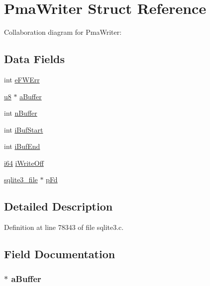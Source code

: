 \hypertarget{struct_pma_writer}{}\section{Pma\+Writer Struct Reference}
\label{struct_pma_writer}


Collaboration diagram for Pma\+Writer\+:
\subsection*{Data Fields}
\begin{DoxyCompactItemize}
\item 
int \hyperlink{struct_pma_writer_a328c9f566a5d1c3b17c5c7a19cb5db26}{e\+F\+W\+Err}
\item 
\hyperlink{sqlite3_8c_a74a0f6424ae628af25f23f0a35f6ead3}{u8} $\ast$ \hyperlink{struct_pma_writer_a0784b18f1d9bbdd738b38824a6166656}{a\+Buffer}
\item 
int \hyperlink{struct_pma_writer_aaa5118b1ad1ecd130e422b18371df061}{n\+Buffer}
\item 
int \hyperlink{struct_pma_writer_adb6e2f168fc6b50afd7c5a4b080faa44}{i\+Buf\+Start}
\item 
int \hyperlink{struct_pma_writer_aca5156f704fce330d23c4423716cf2a3}{i\+Buf\+End}
\item 
\hyperlink{sqlite3_8c_a2a0f0f4ae7001eb54351f77ea1cdbcfd}{i64} \hyperlink{struct_pma_writer_a369b704e04259abc97d1704c7e11939a}{i\+Write\+Off}
\item 
\hyperlink{structsqlite3__file}{sqlite3\+\_\+file} $\ast$ \hyperlink{struct_pma_writer_ae44362cf35caac454319be8c145e374e}{p\+Fd}
\end{DoxyCompactItemize}


\subsection{Detailed Description}


Definition at line 78343 of file sqlite3.\+c.



\subsection{Field Documentation}
\hypertarget{struct_pma_writer_a0784b18f1d9bbdd738b38824a6166656}{}
\subsubsection[{a\+Buffer}]{$\ast$ a\+Buffer}\label{struct_pma_writer_a0784b18f1d9bbdd738b38824a6166656}


